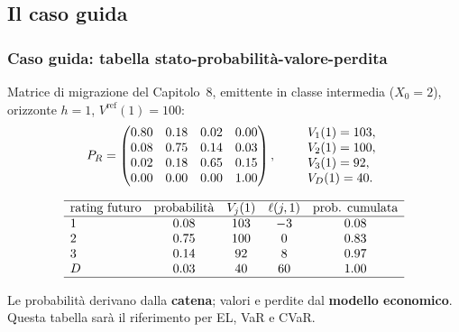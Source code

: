 \subsection{Il caso guida}%

\begin{frame}%
%

\frametitle{Caso guida: tabella stato-probabilit\`{a}-valore-perdita}%
%

%


Matrice di migrazione del Capitolo~8, emittente in classe intermedia
($X_{0}=2$), orizzonte $h=1$, $V^{\mathrm{ref}}(1)=100$:
\[
P_{R} =
\begin{pmatrix}
0.80 & 0.18 & 0.02 & 0.00\\
0.08 & 0.75 & 0.14 & 0.03\\
0.02 & 0.18 & 0.65 & 0.15\\
0.00 & 0.00 & 0.00 & 1.00
\end{pmatrix}
, \qquad%
\begin{array}
[c]{l}%
V_{1}(1)=103,\\
V_{2}(1)=100,\\
V_{3}(1)=92,\\
V_{D}(1)=40.
\end{array}
\]


\medskip%

\[%
\begin{array}
[c]{lcccc}\hline
\text{rating futuro} & \text{probabilit\`{a}} & V_{j}(1) & \ell(j,1) &
\text{prob. cumulata}\\\hline
1 & 0.08 & 103 & -3 & 0.08\\
2 & 0.75 & 100 & 0 & 0.83\\
3 & 0.14 & 92 & 8 & 0.97\\
D & 0.03 & 40 & 60 & 1.00\\\hline
\end{array}
\]


\medskip

\begin{center}
{\small Le probabilit\`{a} derivano dalla \textbf{catena}; valori e perdite
dal \textbf{modello economico}. Questa tabella sar\`{a} il riferimento per EL,
VaR e CVaR.}
\end{center}

%

\transboxout
\end{frame}%


